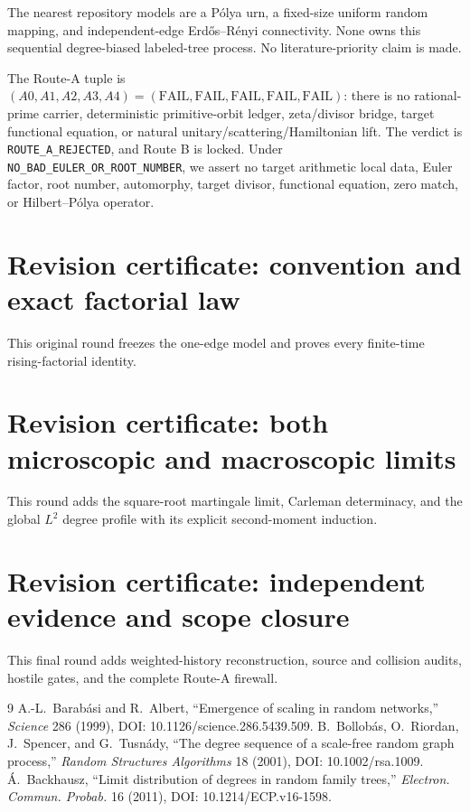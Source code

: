 \documentclass[9pt]{extarticle}
\newcommand{\1}{\mathbf 1}
\begin{document}
The nearest repository models are a P\'olya urn, a fixed-size uniform random
mapping, and independent-edge Erd\H{o}s--R\'enyi connectivity.  None owns this
sequential degree-biased labeled-tree process.  No literature-priority claim
is made.

The Route-A tuple is
$(A0,A1,A2,A3,A4)=(\mathrm{FAIL},\mathrm{FAIL},\mathrm{FAIL},
\mathrm{FAIL},\mathrm{FAIL})$: there is no rational-prime carrier,
deterministic primitive-orbit ledger, zeta/divisor bridge, target functional
equation, or natural unitary/scattering/Hamiltonian lift.  The verdict is
\texttt{ROUTE\_A\_REJECTED}, and Route B is locked.  Under
\texttt{NO\_BAD\_EULER\_OR\_ROOT\_NUMBER}, we assert no target arithmetic
local data, Euler factor, root number, automorphy, target divisor, functional
equation, zero match, or Hilbert--P\'olya operator.
\fi

\ifcase\CRevisionRound
\section*{Revision certificate: convention and exact factorial law}
This original round freezes the one-edge model and proves every finite-time
rising-factorial identity.
\or
\section*{Revision certificate: both microscopic and macroscopic limits}
This round adds the square-root martingale limit, Carleman determinacy, and
the global $L^2$ degree profile with its explicit second-moment induction.
\else
\section*{Revision certificate: independent evidence and scope closure}
This final round adds weighted-history reconstruction, source and collision
audits, hostile gates, and the complete Route-A firewall.
\fi

\begin{thebibliography}{9}
 A.-L.~Barab\'asi and R.~Albert, ``Emergence of scaling in random
networks,'' \emph{Science} 286 (1999), DOI: 10.1126/science.286.5439.509.
 B.~Bollob\'as, O.~Riordan, J.~Spencer, and G.~Tusn\'ady,
``The degree sequence of a scale-free random graph process,'' \emph{Random
Structures Algorithms} 18 (2001), DOI: 10.1002/rsa.1009.
 \'A.~Backhausz, ``Limit distribution of degrees in random
family trees,'' \emph{Electron. Commun. Probab.} 16 (2011),
DOI: 10.1214/ECP.v16-1598.
\end{thebibliography}
\end{document}
